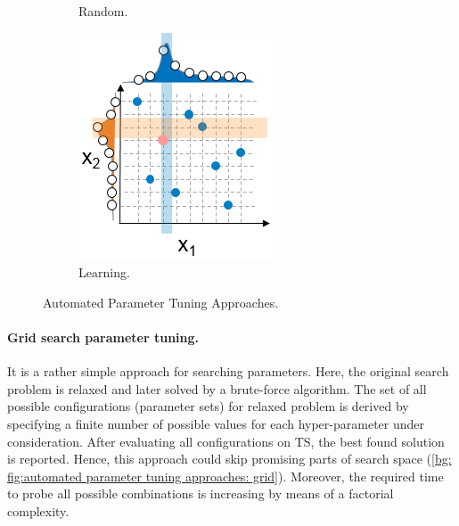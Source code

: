 \begin{figure}
\begin{subfigure}[b]{0.25\linewidth}
		\caption{Random.}
		\label{bg: fig:automated parameter tuning approaches: random}
	\end{subfigure}
	\begin{subfigure}[b]{0.25\linewidth}
		\includegraphics[width=\linewidth]{graphics/Background/hyperparameter-learning-search.png}
		\caption{Learning.}
		\label{bg: fig:automated parameter tuning approaches: learning}
	\end{subfigure}
	\caption{Automated Parameter Tuning Approaches.}
	\label{bg: fig:automated parameter tuning approaches}
\end{figure}

\paragraph{Grid search parameter tuning.} It is a rather simple approach for searching parameters. Here, the original search problem is relaxed and later solved by a brute-force algorithm. The set of all possible configurations (parameter sets) for relaxed problem is derived by specifying a finite number of possible values for each hyper-parameter under consideration. After evaluating all configurations on TS, the best found solution is reported. Hence, this approach could skip promising parts of search space (\cref{bg: fig:automated parameter tuning approaches: grid}). Moreover, the required time to probe all possible combinations is increasing by means of a factorial complexity.

